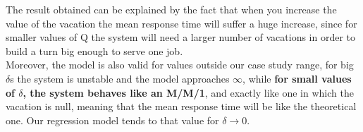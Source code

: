 \documentclass{article}
\begin{document}
                    The result obtained can be explained by the fact that when you increase the value of the vacation the mean response time will suffer a huge increase, since for smaller values of Q the system will need a larger number of vacations in order to build a turn big enough to serve one job.\\
                    
                    Moreover, the model is also valid for values outside our case study range, for big $\delta$s the system is unstable and the model approaches $\infty$, while \textbf{for small values of $\delta$, the system behaves like an M/M/1}, and exactly like one in which the vacation is null, meaning that the mean response time will be like the theoretical one. Our regression model tends to that value for $\delta \rightarrow 0$.
                    
\end{document}

